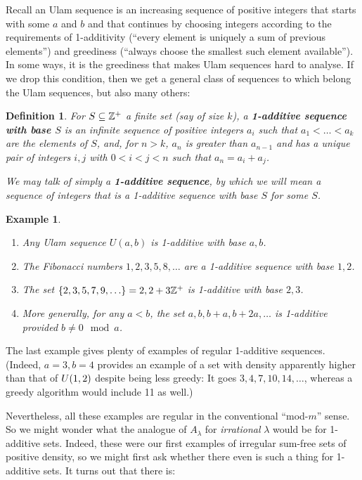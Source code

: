 \documentclass{report}
\newtheorem{definition}[theorem]{Definition}
\newtheorem{example}{Example}
\theoremstyle{remark}
\numberwithin{equation}{section}
\begin{document}
Recall an Ulam sequence is an increasing sequence of positive integers
that starts with some $a$ and $b$ and that continues by choosing
integers according to the requirements of 1-additivity (``every
element is uniquely a sum of previous elements'') and greediness
(``always choose the smallest such element available'').  In some
ways, it is the greediness that makes Ulam sequences hard to analyse.
If we drop this condition, then we get a general class of sequences to
which belong the Ulam sequences, but also many others:

\begin{definition}\label{def:1additive}
  For $S \subseteq \mathbb{Z}^+$ a finite set (say of size $k$), a
  \textbf{1-additive sequence with base $S$} is an infinite sequence
  of positive integers $a_i$ such that $a_1 < \ldots < a_k$ are the
  elements of $S$, and, for $n > k$, $a_n$ is greater than $a_{n-1}$
  and has a unique pair of integers $i, j$ with $0 < i < j < n$ such
  that $a_n = a_i + a_j$.

  We may talk of simply a \textbf{1-additive sequence}, by which we
  will mean a sequence of integers that is a 1-additive sequence with
  base $S$ for some $S$.
\end{definition}

\begin{example}
  \begin{enumerate}
  \item Any Ulam sequence $U(a,b)$ is 1-additive with base $a, b$.  
  \item The Fibonacci numbers $1, 2, 3, 5, 8, \ldots$ are a 1-additive
    sequence with base $1, 2$.  
  \item The set $\{2, 3, 5, 7, 9, \ldots\} = 2, 2+3\mathbb{Z}^+$ is 1-additive
    with base $2, 3$.  
  \item More generally, for any $a < b$, the set $a, b, b+a, b+2a,
    \ldots$ is 1-additive provided $b \neq 0 \mod{a}$.  
  \end{enumerate}
\end{example}

The last example gives plenty of examples of regular 1-additive
sequences.  (Indeed, $a = 3, b = 4$ provides an example of a set with
density apparently higher than that of $U(1,2)$ despite being
less greedy: It goes $3, 4, 7, 10, 14, \ldots$, whereas a greedy
algorithm would include 11 as well.)  

Nevertheless, all these examples are regular in the conventional
``mod-$m$'' sense.  So we might wonder what the analogue of
$A_\lambda$ for {\em irrational} $\lambda$ would be for 1-additive sets.
Indeed, these were our first examples of irregular sum-free sets of
positive density, so we might first ask whether there even is such a
thing for 1-additive sets.  It turns out that there is:
\end{document}
